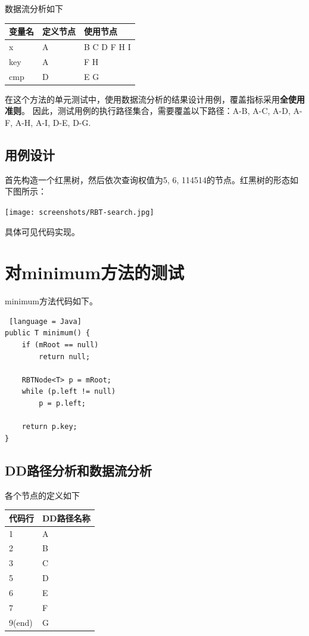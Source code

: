 \documentclass[12pt, a4paper, oneside]{ctexart}
\begin{document}
数据流分析如下

\begin{table}[!h]
    \begin{tabular}{|l|l|l|}
    \hline
    变量名 & 定义节点 & 使用节点 \\ \hline
    x & A & B C D F H I\\ \hline
    key & A & F H \\ \hline
    cmp & D & E G \\ \hline
    \end{tabular}
\end{table}

在这个方法的单元测试中，使用数据流分析的结果设计用例，覆盖指标采用\textbf{全使用准则}。
因此，测试用例的执行路径集合，需要覆盖以下路径：A-B, A-C, A-D, A-F, A-H, A-I, D-E, D-G.

\subsection{用例设计}

首先构造一个红黑树，然后依次查询权值为5, 6, 114514的节点。红黑树的形态如下图所示：

\texttt{[image: screenshots/RBT-search.jpg]}

具体可见代码实现。

\section{对minimum方法的测试}

minimum方法代码如下。

\begin{lstlisting} [language = Java]
public T minimum() {
    if (mRoot == null)
        return null;

    RBTNode<T> p = mRoot;
    while (p.left != null)
        p = p.left;

    return p.key;
}
\end{lstlisting}

\subsection{DD路径分析和数据流分析}

各个节点的定义如下

\begin{table}[!h]
    \begin{tabular}{|l|l|}
    \hline
    代码行 & DD路径名称\\ \hline
    1 & A\\ \hline
    2 & B\\ \hline
    3 & C \\ \hline
    5 & D \\ \hline
    6 & E \\ \hline
    7 & F \\ \hline
    9(end) & G \\ \hline
    \end{tabular}
\end{table}
\end{document}

